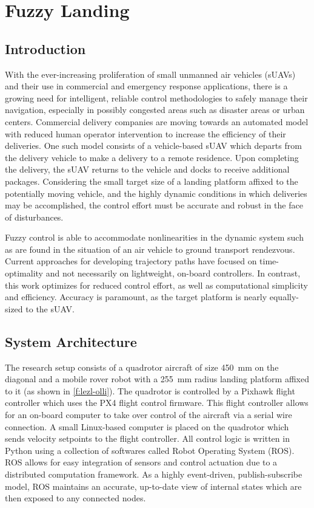 \chapter{Fuzzy Landing}\label{c:landing}
\section{Introduction}
With the ever-increasing proliferation of small unmanned air vehicles (sUAVs) and their use in commercial and
emergency response applications, there is a growing need for intelligent, reliable control methodologies to
safely manage their navigation, especially in possibly congested areas such as disaster areas or urban
centers. Commercial delivery companies are moving towards an automated model with reduced human operator
intervention to increase the efficiency of their deliveries. One such model consists of a vehicle-based sUAV
which departs from the delivery vehicle to make a delivery to a remote residence. Upon completing the
delivery, the sUAV returns to the vehicle and docks to receive additional packages. Considering the small
target size of a landing platform affixed to the potentially moving vehicle, and the highly dynamic conditions
in which deliveries may be accomplished, the control effort must be accurate and robust in the face of
disturbances.

Fuzzy control is able to accommodate nonlinearities in the dynamic system such as are found in the situation
of an air vehicle to ground transport rendezvous\cite{Ionita_2005}. Current approaches for
developing trajectory paths have focused on time-optimality\cite{Adams_2012}\cite{Hehn_2012} and not
necessarily on lightweight, on-board controllers. In contrast, this work optimizes for reduced control
effort, as well as computational simplicity and efficiency. Accuracy is paramount, as the target platform is
nearly equally-sized to the sUAV.

\section{System Architecture}
The research setup consists of a quadrotor aircraft of size \SI{450}{\mm} on the diagonal and a mobile rover
robot with a \SI{255}{mm} radius landing platform affixed to it (as shown in \cref{f:lezl-olli}). The
quadrotor is controlled by a Pixhawk flight controller which uses the PX4 flight control firmware. This flight
controller allows for an on-board computer to take over control of the aircraft via a serial wire connection.
A small Linux-based computer is placed on the quadrotor which sends velocity setpoints to the flight
controller. All control logic is written in Python using a collection of softwares called Robot Operating
System (ROS). ROS allows for easy integration of sensors and control actuation due to a distributed
computation framework. As a highly event-driven, publish-subscribe model, ROS maintains an accurate,
up-to-date view of internal states which are then exposed to any connected nodes.

